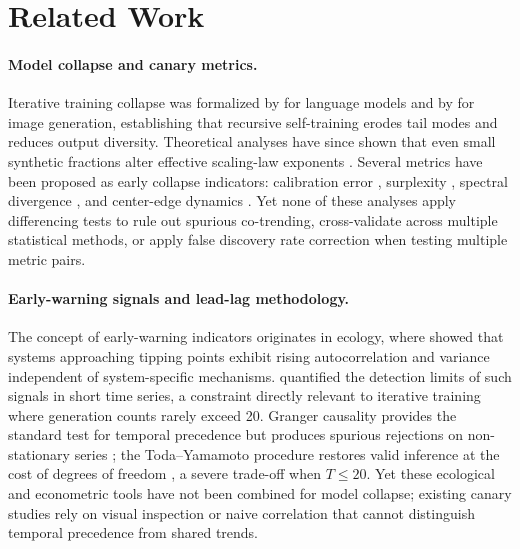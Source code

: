 \section{Related Work}
\label{sec:related_work}

\paragraph{Model collapse and canary metrics.}

Iterative training collapse was formalized by \citet{shumailov2024curse} for language models and by \citet{alemohammad2024mad} for image generation, establishing that recursive self-training erodes tail modes and reduces output diversity.
Theoretical analyses have since shown that even small synthetic fractions alter effective scaling-law exponents \cite{dohmatob2024tale}.
Several metrics have been proposed as early collapse indicators: calibration error \cite{du2026geometric,du2025scales}, surplexity \cite{gambetta2024surplexity}, spectral divergence \cite{sigma2026spectral}, and center-edge dynamics \cite{dces2026counter}.
Yet none of these analyses apply differencing tests to rule out spurious co-trending, cross-validate across multiple statistical methods, or apply false discovery rate correction when testing multiple metric pairs.

\paragraph{Early-warning signals and lead-lag methodology.}

The concept of early-warning indicators originates in ecology, where \citet{scheffer2009early} showed that systems approaching tipping points exhibit rising autocorrelation and variance independent of system-specific mechanisms.
\citet{boettiger2012limits} quantified the detection limits of such signals in short time series, a constraint directly relevant to iterative training where generation counts rarely exceed 20.
Granger causality \cite{granger1969investigating} provides the standard test for temporal precedence but produces spurious rejections on non-stationary series \cite{granger1974spurious}; the Toda--Yamamoto procedure \cite{toda1995statistical} restores valid inference at the cost of degrees of freedom \cite{shojaie2022granger}, a severe trade-off when $T{\leq}20$.
Yet these ecological and econometric tools have not been combined for model collapse; existing canary studies rely on visual inspection or naive correlation that cannot distinguish temporal precedence from shared trends.


